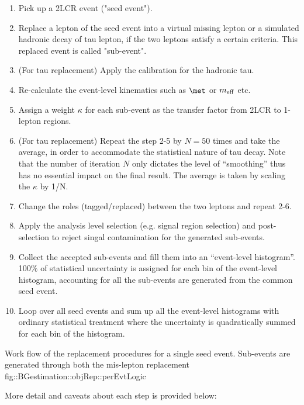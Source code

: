 \begin{enumerate}
\item Pick up a 2LCR event ("seed event").
\item Replace a lepton of the seed event into a virtual missing lepton or a simulated hadronic decay of tau lepton, if the two leptons satisfy a certain criteria. This replaced event is called "sub-event".
\item (For tau replacement) Apply the calibration for the hadronic tau.
\item Re-calculate the event-level kinematics such as $\met$ or $m_{\mathrm{eff}}$ etc.
\item Assign a weight $\kappa$ for each sub-event as the transfer factor from 2LCR to 1-lepton regions.
\item (For tau replacement) Repeat the step 2-5 by $N=50$ times and take the average, in order to accommodate the statistical nature of tau decay. Note that the number of iteration $N$ only dictates the level of ``smoothing'' thus has no essential impact on the final result. The average is taken by scaling the $\kappa$ by 1/N.
\item Change the roles (tagged/replaced) between the two leptons and repeat 2-6. 
\item Apply the analysis level selection (e.g. signal region selection) and post-selection to reject singal contamination for the generated sub-events. 
\item Collect the accepted sub-events and fill them into an ``event-level histogram''. 100$\%$ of statistical uncertainty is assigned for each bin of the event-level histogram, accounting for all the sub-events are generated from the common seed event.
\item Loop over all seed events and sum up all the event-level histograms with ordinary statistical treatment where the uncertainty is quadratically summed for each bin of the histogram. 
\end{enumerate}

{Work flow of the replacement procedures for a single seed event.
Sub-events are generated through both the mis-lepton replacement 
}
{fig::BGestimation::objRep::perEvtLogic}

More detail and caveats about each step is provided below:  \\

